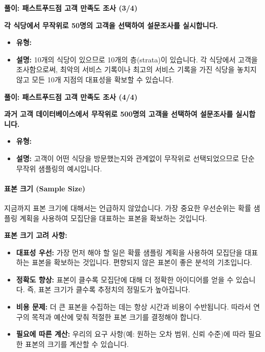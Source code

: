 \documentclass[11pt,a4paper]{article}
\theoremstyle{definition}
\begin{document}
\begin{solutionbox}
\textbf{풀이: 패스트푸드점 고객 만족도 조사 (3/4)}
\begin{enumerate}
    \setcounter{enumi}{2}
    \textbf{각 식당에서 무작위로 50명의 고객을 선택하여 설문조사를 실시합니다.}
    \begin{itemize}
        \item \textbf{유형:} 
        \item \textbf{설명:} 10개의 식당이 있으므로 10개의 층(strata)이 있습니다. 각 식당에서 고객을 조사함으로써, 최악의 서비스 기록이나 최고의 서비스 기록을 가진 식당을 놓치지 않고 모든 10개 지점의 대표성을 확보할 수 있습니다.
    \end{itemize}
\end{enumerate}
\end{solutionbox}

\begin{solutionbox}
\textbf{풀이: 패스트푸드점 고객 만족도 조사 (4/4)}
\begin{enumerate}
    \setcounter{enumi}{3}
    \textbf{과거 고객 데이터베이스에서 무작위로 500명의 고객을 선택하여 설문조사를 실시합니다.}
    \begin{itemize}
        \item \textbf{유형:} 
        \item \textbf{설명:} 고객이 어떤 식당을 방문했는지와 관계없이 무작위로 선택되었으므로 단순 무작위 샘플링의 예시입니다.
    \end{itemize}
\end{enumerate}
\end{solutionbox}

\paragraph{표본 크기 (Sample Size)}
지금까지 표본 크기에 대해서는 언급하지 않았습니다. 가장 중요한 우선순위는 확률 샘플링 계획을 사용하여 모집단을 대표하는 표본을 확보하는 것입니다.

\begin{tcolorbox}[summarybox]
\textbf{표본 크기 고려 사항:}
\begin{itemize}
    \item \textbf{대표성 우선:} 가장 먼저 해야 할 일은 확률 샘플링 계획을 사용하여 모집단을 대표하는 표본을 확보하는 것입니다. 편향되지 않은 표본이 좋은 분석의 기초입니다.
    \item \textbf{정확도 향상:} 표본이 클수록 모집단에 대해 더 정확한 아이디어를 얻을 수 있습니다. 즉, 표본 크기가 클수록 추정치의 정밀도가 높아집니다.
    \item \textbf{비용 문제:} 더 큰 표본을 수집하는 데는 항상 시간과 비용이 수반됩니다. 따라서 연구의 목적과 예산에 맞춰 적절한 표본 크기를 결정해야 합니다.
    \item \textbf{필요에 따른 계산:} 우리의 요구 사항(예: 원하는 오차 범위, 신뢰 수준)에 따라 필요한 표본의 크기를 계산할 수 있습니다.
\end{itemize}
\end{tcolorbox}
\end{document}
